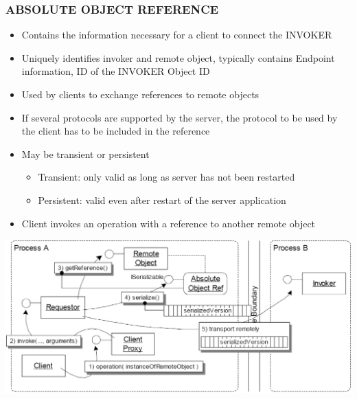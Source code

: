 \documentclass[10pt]{article}
\begin{document}
\subsubsection{ABSOLUTE OBJECT REFERENCE}
\begin{itemize}
	\item Contains the information necessary for a client to connect the INVOKER
	\item Uniquely identifies invoker and remote object, typically contains Endpoint information, ID of the INVOKER Object ID
	\item Used by clients to exchange references to remote objects
	\item If several protocols are supported by the server, the protocol to be used by the client has to be included in the reference
	\item May be transient or persistent
		\begin{itemize}
			\item Transient: only valid as long as server has not been restarted
			\item Persistent: valid even after restart of the server application
		\end{itemize}
	\item Client invokes an operation with a reference to another remote object
\end{itemize}
\begin{center}
	\includegraphics[scale=0.2]{images/absolute-object-reference.png}
\end{center}
\end{document}
